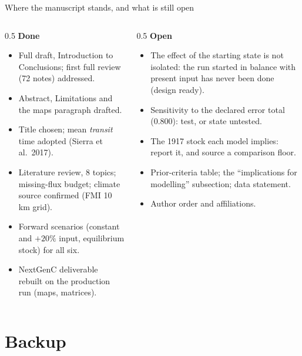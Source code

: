 \documentclass[aspectratio=169,11pt]{beamer}
\begin{document}
\begin{frame}{Where the manuscript stands, and what is still open}
  \footnotesize
  \begin{columns}[T]
    \begin{column}{0.5\textwidth}
      \textbf{Done}
      \begin{itemize}
        \item Full draft, Introduction to Conclusions; first full review (72 notes) addressed.
        \item Abstract, Limitations and the maps paragraph drafted.
        \item Title chosen; mean \emph{transit} time adopted (Sierra et al.\ 2017).
        \item Literature review, 8 topics; missing-flux budget; climate source confirmed (FMI 10 km grid).
        \item Forward scenarios (constant and $+20\%$ input, equilibrium stock) for all six.
        \item NextGenC deliverable rebuilt on the production run (maps, matrices).
      \end{itemize}
    \end{column}
    \begin{column}{0.5\textwidth}
      \textbf{Open}
      \begin{itemize}
        \item \alert{The effect of the starting state is not isolated}: the run started in balance with present input has never been done (design ready).
        \item Sensitivity to the declared error total (0.800): test, or state untested.
        \item The 1917 stock each model implies: report it, and source a comparison floor.
        \item Prior-criteria table; the ``implications for modelling'' subsection; data statement.
        \item Author order and affiliations.
      \end{itemize}
    \end{column}
  \end{columns}
\end{frame}

\appendix
\section{Backup}
\end{document}

